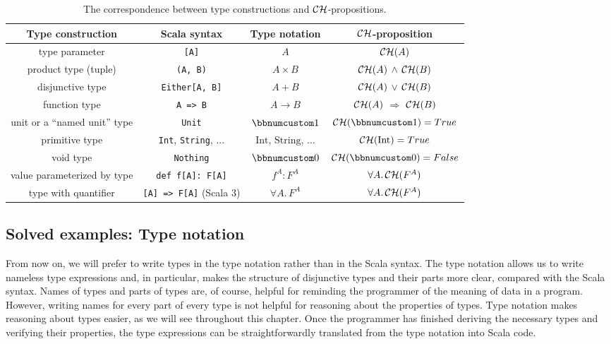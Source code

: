 \begin{table}
\begin{centering}
\begin{tabular}{|c|c|c|c|}
\hline 
\textbf{\small{}Type construction} & \textbf{\small{}Scala syntax} & \textbf{\small{}Type notation} & \textbf{\small{}${\cal CH}$-proposition}\tabularnewline
\hline 
\hline 
{\small{}type parameter} & \lstinline![A]! & $A$ & ${\cal CH}(A)$\tabularnewline
\hline 
{\small{}product type (tuple)}  & \lstinline!(A, B)! & $A\times B$ & ${\cal CH}(A)$ $\wedge$ ${\cal CH}(B)$\tabularnewline
\hline 
{\small{}disjunctive type}  & \lstinline!Either[A, B]! & $A+B$ & ${\cal CH}(A)$ $\vee$ ${\cal CH}(B)$\tabularnewline
\hline 
{\small{}function type}  & \lstinline!A => B! & $A\rightarrow B$ & ${\cal CH}(A)$ $\Rightarrow$ ${\cal CH}(B)$\tabularnewline
\hline 
{\small{}unit or a \textsf{``}named unit\textsf{''} type} & \lstinline!Unit! & $\bbnum 1$ & ${\cal CH}(\bbnum 1)=True$\tabularnewline
\hline 
{\small{}primitive type} & {\small{}}\lstinline!Int!{\small{}, }\lstinline!String!{\small{},
...} & {\small{}$\text{Int}$, $\text{String}$, ...} & ${\cal CH}(\text{Int})=True$\tabularnewline
\hline 
{\small{}void type} & \lstinline!Nothing! & $\bbnum 0$ & ${\cal CH}(\bbnum 0)=False$\tabularnewline
\hline 
{\small{}value parameterized by type} & \lstinline!def f[A]: F[A]! & $f^{A}:F^{A}$ & $\forall A.\,{\cal CH}(F^{A})$\tabularnewline
\hline 
{\small{}type with quantifier} & \lstinline![A] => F[A]!{\small{} (Scala 3)} & $\forall A.\,F^{A}$ & $\forall A.\,{\cal CH}(F^{A})$\tabularnewline
\hline 
\end{tabular}
\par\end{centering}
\caption{The correspondence between type constructions
and ${\cal CH}$-propositions.\label{tab:ch-correspondence-type-notation-CH-propositions}}
\end{table}


\subsection{Solved examples: Type notation}

From now on, we will prefer to write types in the type notation rather
than in the Scala syntax. The type notation allows us to write nameless
type expressions and, in particular, makes the structure of disjunctive
types and their parts more clear, compared with the Scala syntax.
Names of types and parts of types are, of course, helpful for reminding
the programmer of the meaning of data in a program. However, writing
names for every part of every type is not helpful for reasoning about
the properties of types. Type notation makes reasoning about types
easier, as we will see throughout this chapter. Once the programmer
has finished deriving the necessary types and verifying their properties,
the type expressions can be straightforwardly translated from the
type notation into Scala code.

